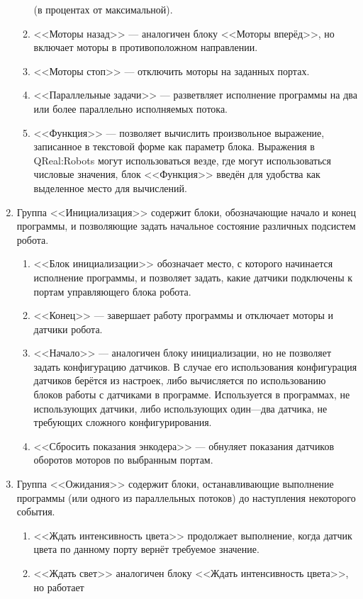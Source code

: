 \begin{enumerate}
\begin{enumerate}
				(в процентах от максимальной).
			\item <<Моторы назад>> --- аналогичен блоку <<Моторы вперёд>>, но включает моторы 
				в противоположном направлении.
			\item <<Моторы стоп>>  --- отключить моторы на заданных портах.
			\item <<Параллельные задачи>> --- разветвляет исполнение программы на два или 
				более параллельно исполняемых потока.
			\item <<Функция>> --- позволяет вычислить произвольное выражение, записанное 
				в текстовой форме как параметр блока. Выражения в QReal:Robots могут использоваться 
				везде, где могут использоваться числовые значения, блок <<Функция>> введён 
				для удобства как выделенное место для вычислений.
		\end{enumerate}
	\item Группа <<Инициализация>> содержит блоки, обозначающие начало и конец программы, 
		и позволяющие задать начальное состояние различных подсистем робота.
		\begin{enumerate}
			\item <<Блок инициализации>> обозначает место, с которого начинается исполнение 
				программы, и позволяет задать, какие датчики подключены к портам управляющего 
				блока робота.
			\item <<Конец>> --- завершает работу программы и отключает моторы и датчики робота.
			\item <<Начало>> --- аналогичен блоку инициализации, но не позволяет задать 
				конфигурацию датчиков. В случае его использования конфигурация датчиков берётся 
				из настроек, либо вычисляется по использованию блоков работы с датчиками в 
				программе. Используется в программах, не использующих датчики, либо использующих 
				один---два датчика, не требующих сложного конфигурирования.
			\item <<Сбросить показания энкодера>> --- обнуляет показания датчиков оборотов 
				моторов по выбранным портам.
		\end{enumerate}
	\item Группа <<Ожидания>> содержит блоки, останавливающие выполнение программы (или 
		одного из параллельных потоков) до наступления некоторого события.
		\begin{enumerate}
			\item <<Ждать интенсивность цвета>> продолжает выполнение, когда датчик цвета 
				по данному порту вернёт требуемое значение.
			\item <<Ждать свет>> аналогичен блоку <<Ждать интенсивность цвета>>, но работает 

\end{enumerate}
\end{enumerate}
